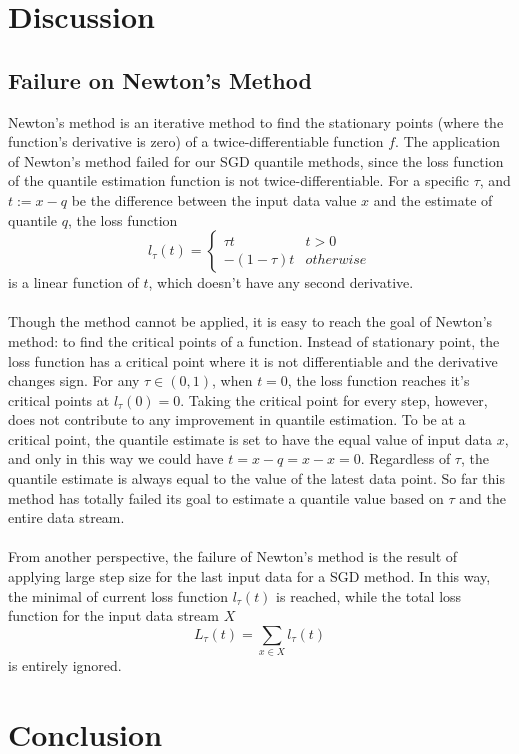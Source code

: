 \documentclass[12pt]{article}
\begin{document}
\section{Discussion}
\subsection{Failure on Newton's Method}
Newton's method is an iterative method to find the stationary points (where the function's derivative is zero) of a twice-differentiable function $f$. The application of Newton's method failed for our SGD quantile methods, since the loss function of the quantile estimation function is not twice-differentiable. For a specific $\tau$, and $t := x - q$ be the difference between the input data value $x$ and the estimate of quantile $q$, the loss function 
$$
l_\tau(t)= 
    \begin{cases}
        \tau t & t > 0\\
        -(1-\tau) t & otherwise
    \end{cases}
$$
is a linear function of $t$, which doesn't have any second derivative. 
\\\\
Though the method cannot be applied, it is easy to reach the goal of Newton's method: to find the critical points of a function. Instead of stationary point, the loss function has a critical point where it is not differentiable and the derivative changes sign. For any $\tau \in (0,1)$, when $t=0$, the loss function reaches it's critical points at $l_\tau(0) = 0$. Taking the critical point for every step, however, does not contribute to any improvement in quantile estimation. To be at a critical point, the quantile estimate is set to have the equal value of input data $x$, and only in this way we could have $t = x-q = x-x = 0$. Regardless of $\tau$, the quantile estimate is always equal to the value of the latest data point. So far this method has totally failed its goal to estimate a quantile value based on $\tau$ and the entire data stream.
\\\\
From another perspective, the failure of Newton's method is the result of applying large step size for the last input data for a SGD method. In this way, the minimal of current loss function $l_\tau(t)$ is reached, while the total loss function for the input data stream $X$
$$
L_{\tau}(t) = \sum_{x \in X} l_{\tau}(t)
$$
is entirely ignored.
\section{Conclusion}
\end{document}
